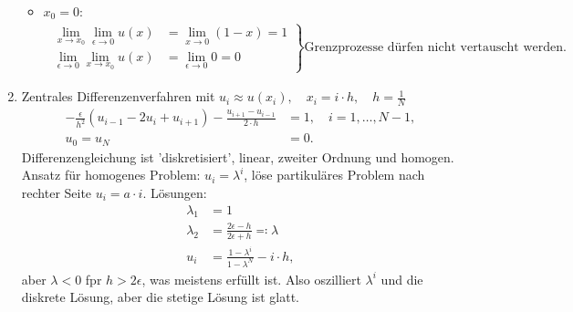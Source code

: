 \begin{enumerate}
\begin{itemize}
\item $x_{0} = 0$:
\begin{align*}\left. 
  \begin{aligned}
    \lim_{x \to x_{0}} \lim_{\epsilon \to 0} u(x) &= \lim_{x \to 0} (1 - x) = 1\\
    \lim_{\epsilon \to 0} \lim_{x \to x_{0}} u(x) &= \lim_{ \epsilon \to 0}  0 = 0
  \end{aligned} \right\}\text{Grenzprozesse dürfen nicht vertauscht werden}. 
\end{align*}
\end{itemize}
\item Zentrales Differenzenverfahren mit $u_{i} \approx u(x_{i}), \quad x_{i} = i\cdot h, \quad h = \frac 1 N$
  \begin{align*}
    - \frac \epsilon {h^{2}} (u_{i-1} - 2u_{i} + u_{i+1})- \frac {u_{i+1} - u_{i-1}} {2\cdot h} &= 1, \quad i = 1, \dots, N-1,\\
u_{0} = u_{N} &= 0. 
  \end{align*}
Differenzengleichung ist 'diskretisiert', linear, zweiter Ordnung und homogen. Ansatz für homogenes Problem: $u_{i} = \lambda^{i}$, löse partikuläres Problem nach rechter Seite $u_{i} = a \cdot i$. Lösungen:
\begin{align*}
  \lambda_{1} &= 1\\
   \lambda_{2} &= \frac{2 \epsilon - h}{2 \epsilon + h} \eqqcolon \lambda\\
   u_{i} &= \frac{1 - \lambda^{i}}{1 - \lambda^{N}} - i\cdot h, 
\end{align*}
aber $\lambda < 0$ fpr $h > 2 \epsilon$, was meistens erfüllt ist. Also oszilliert $\lambda^{i}$ und die diskrete Lösung, aber die stetige Lösung ist glatt. 


\end{enumerate}
